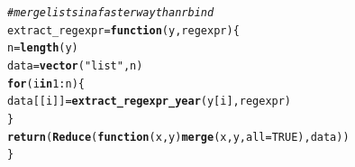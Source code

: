 \documentclass{llncs}\usepackage[]{graphicx}\usepackage[]{color}
\makeatletter
\newcommand{\hlnum}[1]{\textcolor[rgb]{0.686,0.059,0.569}{#1}}%
\newcommand{\hlstr}[1]{\textcolor[rgb]{0.192,0.494,0.8}{#1}}%
\newcommand{\hlcom}[1]{\textcolor[rgb]{0.678,0.584,0.686}{\textit{#1}}}%
\newcommand{\hlopt}[1]{\textcolor[rgb]{0,0,0}{#1}}%
\newcommand{\hlstd}[1]{\textcolor[rgb]{0.345,0.345,0.345}{#1}}%
\newcommand{\hlkwa}[1]{\textcolor[rgb]{0.161,0.373,0.58}{\textbf{#1}}}%
\newcommand{\hlkwb}[1]{\textcolor[rgb]{0.69,0.353,0.396}{#1}}%
\newcommand{\hlkwc}[1]{\textcolor[rgb]{0.333,0.667,0.333}{#1}}%
\newcommand{\hlkwd}[1]{\textcolor[rgb]{0.737,0.353,0.396}{\textbf{#1}}}%
\newenvironment{kframe}{%
 \def\at@end@of@kframe{}%
 \ifinner\ifhmode%
  \def\at@end@of@kframe{\end{minipage}}%
  \begin{minipage}{\columnwidth}%
 \fi\fi%
 \def\FrameCommand##1{\hskip\@totalleftmargin \hskip-\fboxsep
 \colorbox{shadecolor}{##1}\hskip-\fboxsep
     \hskip-\linewidth \hskip-\@totalleftmargin \hskip\columnwidth}%
 \MakeFramed {\advance\hsize-\width
   \@totalleftmargin\z@ \linewidth\hsize
   \@setminipage}}%
 {\par\unskip\endMakeFramed%
 \at@end@of@kframe}
\newenvironment{knitrout}{}{} %
\makeatother
\begin{document}
\begin{knitrout}
\color{fgcolor}\begin{kframe}
\begin{alltt}
\hlcom{#merge lists in a faster way than rbind}
\hlstd{extract_regexpr} \hlkwb{=} \hlkwa{function}\hlstd{(}\hlkwc{y}\hlstd{,}\hlkwc{regexpr}\hlstd{)\{}
  \hlstd{n}\hlkwb{=}\hlkwd{length}\hlstd{(y)}
  \hlstd{data}\hlkwb{=}\hlkwd{vector}\hlstd{(}\hlstr{"list"}\hlstd{, n)}
  \hlkwa{for} \hlstd{(i} \hlkwa{in} \hlnum{1}\hlopt{:}\hlstd{n)\{}
    \hlstd{data[[i]]}\hlkwb{=}\hlkwd{extract_regexpr_year}\hlstd{(y[i],regexpr)}
  \hlstd{\}}
  \hlkwd{return}\hlstd{(}\hlkwd{Reduce}\hlstd{(}\hlkwa{function}\hlstd{(}\hlkwc{x}\hlstd{,} \hlkwc{y}\hlstd{)} \hlkwd{merge}\hlstd{(x, y,} \hlkwc{all}\hlstd{=}\hlnum{TRUE}\hlstd{), data))}
\hlstd{\}}


\end{alltt}
\end{kframe}
\end{knitrout}
\end{document}
